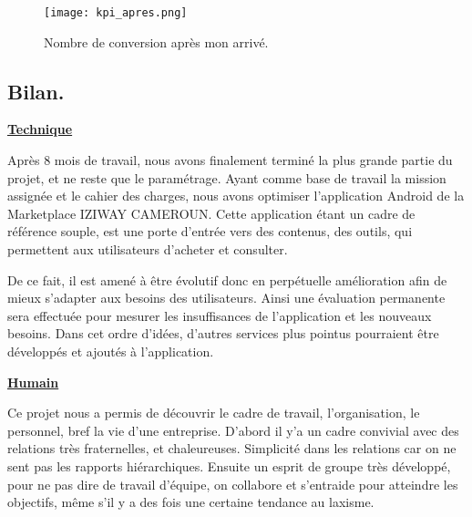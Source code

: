 \begin{figure}[H]
	\centering
	\texttt{[image: kpi\_apres.png]}
	\caption{Nombre de conversion après mon arrivé.}
	\label{fig:sp0}
\end{figure}

\subsection{Bilan.}

\textbf{\underline{Technique}}

Après 8 mois de travail, nous avons finalement terminé la plus grande partie du projet, et ne reste que le paramétrage. Ayant comme base de travail la mission assignée et le cahier des charges, nous avons optimiser l’application Android de la Marketplace IZIWAY CAMEROUN. Cette application étant un cadre de référence souple, est une porte d’entrée vers des contenus, des outils, qui permettent aux utilisateurs d’acheter et consulter.

De ce fait, il est amené à être évolutif donc en perpétuelle amélioration afin de mieux s’adapter aux besoins des utilisateurs. Ainsi une évaluation permanente sera effectuée pour mesurer les insuffisances de l’application et les nouveaux besoins. Dans cet ordre d’idées, d’autres services plus pointus pourraient être développés et ajoutés à l’application.

\textbf{\underline{Humain}}

Ce projet nous a permis de découvrir le cadre de travail, l’organisation, le personnel, bref la vie d’une entreprise. D’abord il y’a un cadre convivial avec des relations très fraternelles, et chaleureuses. Simplicité dans les relations car on ne sent pas les rapports hiérarchiques. Ensuite un esprit de groupe très développé, pour ne pas dire de travail d’équipe, on collabore et s’entraide pour atteindre les objectifs, même s’il y a des fois une certaine tendance au laxisme.

